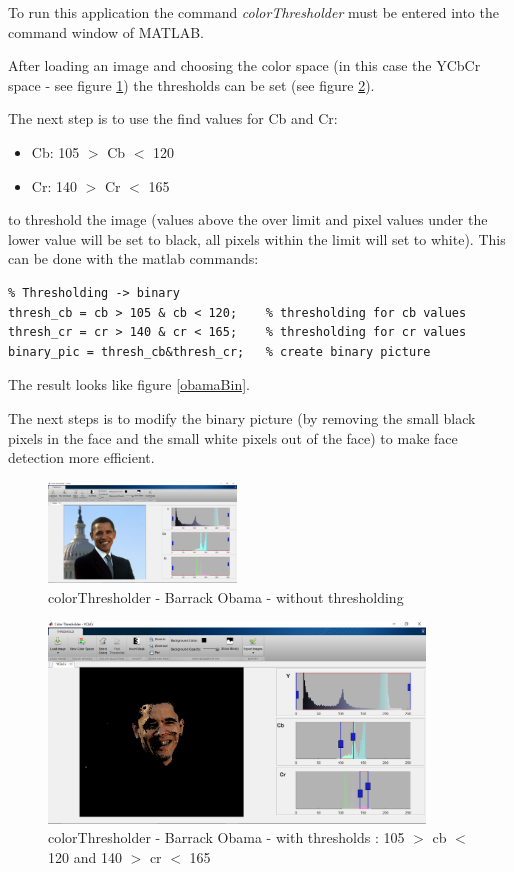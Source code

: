 \documentclass[Bachelorarbeit.tex]{subfiles}
\begin{document}
\medskip
To run this application the command \textit{colorThresholder} must be entered into the command window of MATLAB.

\medskip
After loading an image and choosing the color space (in this case the YCbCr space - see figure \ref{obamaOrig}) the thresholds can be set (see figure \ref{obamaThres}).

The next step is to use the find values for Cb and Cr:
\begin{itemize}
\item Cb: 105 $>$ Cb $<$ 120
\item Cr: 140 $>$ Cr $<$ 165
\end{itemize}

to threshold the image (values above the over limit and pixel values under the lower value will be set to black, all pixels within the limit will set to white). This can be done with the matlab commands:
\begin{lstlisting}
% Thresholding -> binary
thresh_cb = cb > 105 & cb < 120;    % thresholding for cb values
thresh_cr = cr > 140 & cr < 165;    % thresholding for cr values
binary_pic = thresh_cb&thresh_cr;   % create binary picture
\end{lstlisting}
The result looks like figure \ref{obamaBin}.

\medskip
The next steps is to modify the binary picture (by removing the small black pixels in the face and the small white pixels out of the face) to make face detection more efficient.

\begin{figure}[!h]
\centering
\includegraphics[width=5cm]{./img/thresholds/obama_orig.PNG}
\caption{colorThresholder - Barrack Obama - without thresholding}
\label{obamaOrig}
\end{figure}

\begin{figure}[!h]
\centering
\includegraphics[width=10cm]{./img/thresholds/obama_thresholds.PNG}
\caption[colorThresholder - Barrack Obama - with thresholds]{colorThresholder - Barrack Obama - with thresholds : 105 $>$ cb $<$ 120 and 140 $>$ cr $<$ 165}
\label{obamaThres}
\end{figure}
\end{document}
